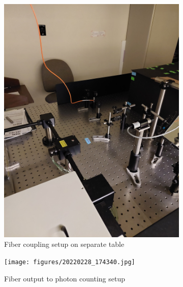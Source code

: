 \documentclass[a4paper]{article}
\begin{document}
\begin{figure}[!htb]
     \centering
     \begin{subfigure}[t]{0.25\textwidth}
         \centering
         \includegraphics[angle=270,origin=c,width=\textwidth]{figures/20220228_174444.jpg}
         \caption{Fiber coupling setup on separate table}
         \label{fig:nkt_fiber_coupling}
     \end{subfigure}
     \hfill
     \begin{subfigure}[t]{0.25\textwidth}
         \centering
         \texttt{[image: figures/20220228\_174340.jpg]}
         \caption{Fiber output to photon counting setup}
         \label{fig:fiber_output}
     \end{subfigure}
     \hfill
     \begin{subfigure}[t]{0.4\textwidth}
         \centering

\end{subfigure}
\end{figure}
\end{document}
